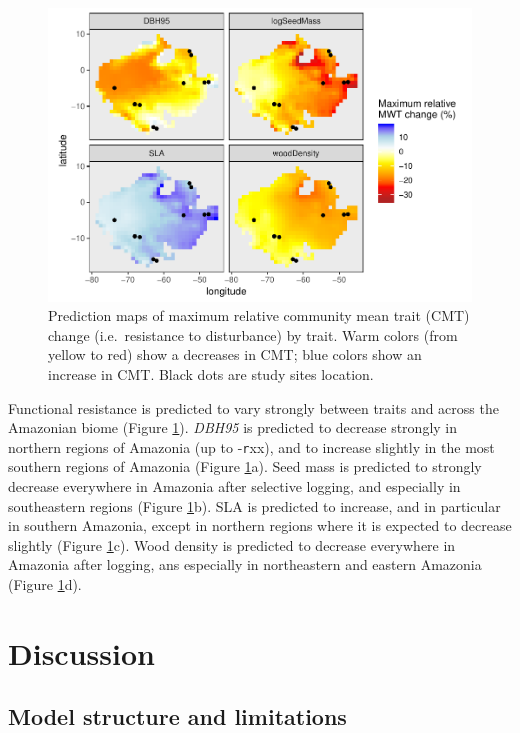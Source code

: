 \documentclass[]{elsarticle} %
\makeatletter
\def\maxwidth{\ifdim\Gin@nat@width>\linewidth\linewidth
\else\Gin@nat@width\fi}
\let\Oldincludegraphics\includegraphics
\renewcommand{\includegraphics}[1]{\Oldincludegraphics[width=\maxwidth]{#1}}
\makeatother
\begin{document}
\begin{figure}
\centering
\includegraphics{rticle_tmfo_functional_files/figure-latex/maps_pred-1.pdf}
\caption{\label{fig:predmap}Prediction maps of maximum relative
community mean trait (CMT) change (i.e.~resistance to disturbance) by
trait. Warm colors (from yellow to red) show a decreases in CMT; blue
colors show an increase in CMT. Black dots are study sites location.}
\end{figure}

Functional resistance is predicted to vary strongly between traits and
across the Amazonian biome (Figure \ref{fig:predmap}). \emph{DBH95} is
predicted to decrease strongly in northern regions of Amazonia (up to
-\texttt{r}xx), and to increase slightly in the most southern regions of
Amazonia (Figure \ref{fig:predmap}a). Seed mass is predicted to strongly
decrease everywhere in Amazonia after selective logging, and especially
in southeastern regions (Figure \ref{fig:predmap}b). SLA is predicted to
increase, and in particular in southern Amazonia, except in northern
regions where it is expected to decrease slightly (Figure
\ref{fig:predmap}c). Wood density is predicted to decrease everywhere in
Amazonia after logging, ans especially in northeastern and eastern
Amazonia (Figure \ref{fig:predmap}d).

\section{Discussion}\label{discussion}

\subsection{Model structure and
limitations}\label{model-structure-and-limitations}
\end{document}
